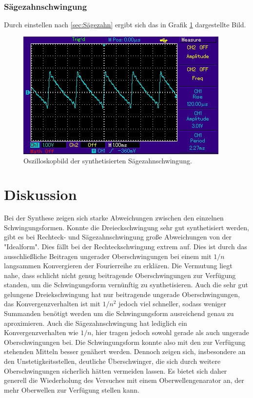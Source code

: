 \subsubsection{Sägezahnschwingung}
Durch einstellen nach \ref{sec:Sägezahn} ergibt sich das in Grafik \ref{abb:3} dargestellte
Bild.
\begin{figure}
  \centering
  \includegraphics[scale=0.4]{Saegezahn.png}
  \caption{Oszilloskopbild der synthetisierten Sägezahnschwingung.}
  \label{abb:3}
\end{figure}
\section{Diskussion}
Bei der Synthese zeigen sich starke Abweichungen zwischen den einzelnen Schwingungsformen.
Konnte die Dreieckschwingung sehr gut synthetisiert werden, gibt es bei Rechteck- und Sägezahnschwingung
große Abweichungen von der "Idealform". Dies fällt bei der Rechteckschwingung extrem auf.
Dies ist durch das ausschließliche Beitragen ungerader Oberschwingungen bei einem mit
$1/n$ langsammen Konvergieren der Fourierreihe zu erklären. Die Vermutung liegt nahe,
dass schlicht nicht genug beitragende Oberschwingungen zur Verfügung standen, um die
Schwingungsform vernünftig zu synthetisieren. Auch die sehr gut gelungene Dreiekschwingung
hat nur beitragende ungerade Oberschwingungen, das Konvergenzverhalten ist mit $1/n^2$
jedoch viel schneller, sodass weniger Summanden benötigt werden um die Schwingungsform
ausreichend genau zu aproximieren. Auch die Sägezahnschwingung hat lediglich ein
Konvergenzverhalten wie $1/n$, hier tragen jedoch sowohl gerade als auch ungerade Oberschwingungen
bei. Die Schwingungsform konnte also mit den zur Verfügung stehenden Mitteln besser genähert werden.
Dennoch zeigen sich, insbesondere an den Unstetigkeitsstellen, deutliche Überschwinger, die
sich durch weitere Oberschwingungen sicherlich hätten vermeiden lassen. Es bietet sich daher
generell die Wiederholung des Versuches mit einem Oberwellengenarator an, der mehr
Oberwellen zur Verfügung stellen kann.
\newpage
\nocite{*}
\printbibliography
